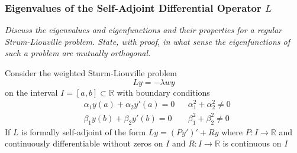 \documentclass[11pt, a4paper]{article}
\newcommand{\question}[1]{\textit{#1}\vspace{2mm}}
\newcommand{\R}{\mathbb{R}} %
\begin{document}
\subsubsection{Eigenvalues of the Self-Adjoint Differential Operator $ L $}
\question{Discuss the eigenvalues and eigenfunctions and their properties for a regular Strum-Liouville problem. State, with proof, in what sense the eigenfunctions of such a problem are mutually orthogonal.}

Consider the weighted Sturm-Liouville problem
\begin{equation*}
	L y = - \lambda w y 
\end{equation*}
on the interval $ I = [a, b] \subset \R $ with boundary conditions
\begin{align*}
	&\alpha_1 y(a) + \alpha_2 y'(a) = 0 && \alpha_1^2 + \alpha_2^2 \neq 0\\
	&\beta_1y(b) + \beta_2 y'(b) = 0 &&  \beta_1^2 + \beta_2^2 \neq 0
\end{align*}
If $ L $ is formally self-adjoint of the form $ Ly = (Py')' + Ry $ where $ P: I \to \R  $ and continuously differentiable without zeros on $ I $ and $ R : I \to \R $ is continuous on $ I $
\end{document}
